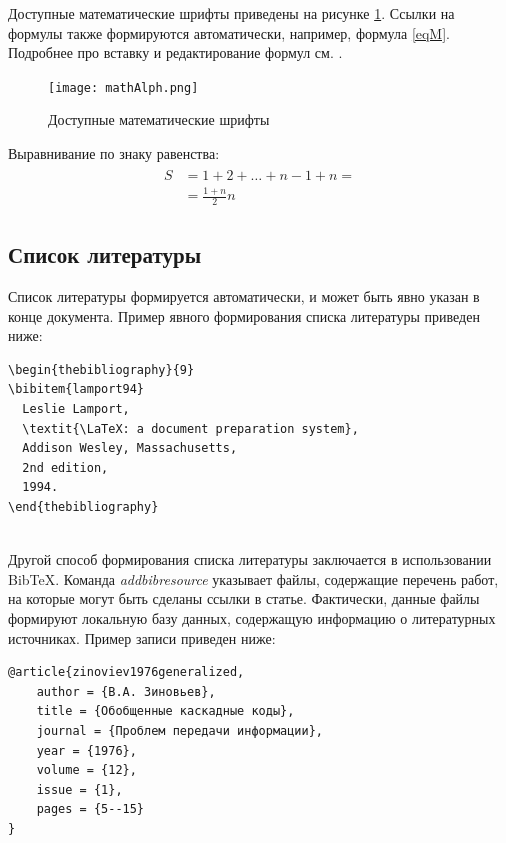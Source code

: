 Доступные математические шрифты приведены на рисунке \ref{f3}.
Ссылки на формулы также формируются автоматически, например, формула \eqref{eqM}.
Подробнее про вставку и редактирование формул см. \cite{latexMath}.

\begin{figure}
  \centering
  \texttt{[image: mathAlph.png]}
  \caption{Доступные математические шрифты}
  \label{f3}
\end{figure}

Выравнивание по знаку равенства:
\begin{align}
  \begin{split}
    S &= 1 + 2 + \dots + n - 1 + n =\\
      &= \frac{1 + n}{2}n
  \end{split}
\end{align}

\subsection{Список литературы}
Список литературы формируется автоматически, и может быть явно указан в конце документа.
Пример явного формирования списка литературы приведен ниже:\\[1em]

\begin{minipage}{\linewidth} %
\begin{verbatim}
\begin{thebibliography}{9}
\bibitem{lamport94}
  Leslie Lamport,
  \textit{\LaTeX: a document preparation system},
  Addison Wesley, Massachusetts,
  2nd edition,
  1994.
\end{thebibliography}
\end{verbatim}
\end{minipage}\\[1em]

Другой способ формирования списка литературы заключается в использовании BibTeX.
Команда {\em addbibresource} указывает файлы, содержащие перечень работ, на которые могут быть сделаны ссылки в статье.
Фактически, данные файлы формируют локальную базу данных, содержащую информацию о литературных источниках.
Пример записи приведен ниже:\\[1em]

\begin{minipage}{\linewidth} %
\begin{verbatim}
@article{zinoviev1976generalized,
    author = {В.А. Зиновьев},
    title = {Обобщенные каскадные коды},
    journal = {Проблем передачи информации},
    year = {1976},
    volume = {12},
    issue = {1},
    pages = {5--15}
}
\end{verbatim}
\end{minipage}\\[1em]

